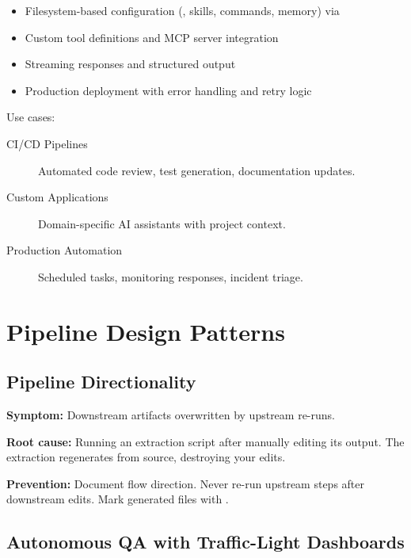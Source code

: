\begin{itemize}
  \item Filesystem-based configuration (, skills, commands, memory)
    via 
  \item Custom tool definitions and MCP server integration
  \item Streaming responses and structured output
  \item Production deployment with error handling and retry logic
\end{itemize}

Use cases:
\begin{description}
  \item[CI/CD Pipelines] Automated code review, test generation, documentation updates.
  \item[Custom Applications] Domain-specific AI assistants with project context.
  \item[Production Automation] Scheduled tasks, monitoring responses, incident triage.
\end{description}

\section{Pipeline Design Patterns}
\label{sec:pipeline-patterns}


\subsection{Pipeline Directionality}

\begin{warnbox}
\textbf{Symptom:} Downstream artifacts overwritten by upstream re-runs.

\textbf{Root cause:} Running an extraction script after manually editing
its output. The extraction regenerates from source, destroying your edits.

\textbf{Prevention:} Document flow direction.
Never re-run upstream steps after downstream edits.
Mark generated files with .
\end{warnbox}

\subsection{Autonomous QA with Traffic-Light Dashboards}

